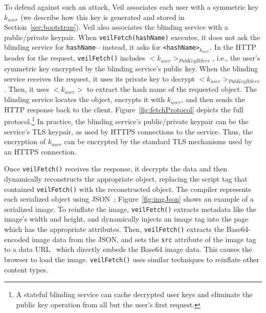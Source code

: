 To defend against such an attack, Veil associates
each user with a symmetric key $k_{user}$ (we describe
how this key is generated and stored in
Section~\ref{sec:bootstrap}). Veil also associates the
blinding service with a public/private keypair. When
\texttt{veilFetch(hashName)} executes, it does not
ask the blinding service for \texttt{hashName}---instead,
it asks for \texttt{<hashName>}$_{k_{user}}$. In the
HTTP header for the request, \texttt{veilFetch()} includes
$<k_{user}>_{PubKeyBServ}$, i.e., the user's symmetric
key encrypted by the blinding service's public key.
When the blinding service receives the request,
it uses its private key to decrypt $<k_{user}>_{PubKeyBServ}$.
Then, it uses $<k_{user}>$ to extract the hash
name of the requested object. The blinding service
locates the object, encrypts it with $k_{user}$,
and then sends the HTTP response back to the
client. Figure~\ref{fig:fetchProtocol} depicts
the full protocol.\footnote{%
	A stateful blinding service can cache decrypted
	user keys and eliminate the public key operation
	from all but the user's first request.} In practice,
the blinding service's public/private
keypair can be the service's TLS keypair, as used
by HTTPS connections to the service. Thus, the
encryption of $k_{user}$ can be encrypted by the
standard TLS mechanisms used by an HTTPS connection.

Once \texttt{veilFetch()} receives the response,
it decrypts the data and then dynamically
reconstructs the appropriate object, replacing
the script tag that contained \texttt{veilFetch()}
with the reconstructed object. The compiler
represents each serialized object using JSON~\cite{json};
Figure~\ref{fig:imgJson} shows an example
of a serialized image. To reinflate
the image, \texttt{veilFetch()} extracts
metadata like the image's width and height,
and dynamically injects an image tag into
the page which has the appropriate attributes.
Then, \texttt{veilFetch()} extracts the
Base64-encoded image data from the JSON,
and sets the \texttt{src} attribute
of the image tag to a data URL~\cite{dataUrl}
which directly embeds the Base64 image
data. This causes the browser to load the
image. \texttt{veilFetch()} uses similar
techniques to reinflate other content types.

